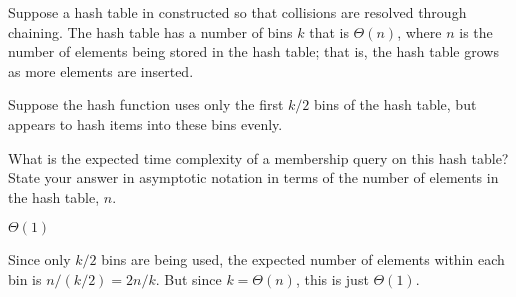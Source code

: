 \begin{prob}
    Suppose a hash table in constructed so that collisions are resolved through chaining. The hash
    table has a number of bins $k$ that is $\Theta(n)$, where $n$ is the number of elements being
    stored in the hash table; that is, the hash table grows as more elements are inserted.

    Suppose the hash function uses only the first $k / 2$ bins of the hash table, but appears to
    hash items into these bins evenly.

    What is the expected time complexity of a membership query on
    this hash table? State your answer in asymptotic notation in terms of the
    number of elements in the hash table, $n$.

    \begin{soln}
        $\Theta(1)$

        Since only $k/2$ bins are being used, the expected number of elements
        within each bin is $n / (k/2) = 2n / k$. But since $k = \Theta(n)$, this
        is just $\Theta(1)$.
    \end{soln}

\end{prob}
